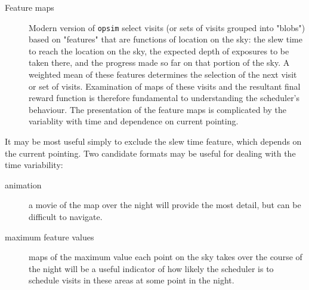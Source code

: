 \begin{description}
\item[{Feature maps}] Modern version of \texttt{opsim} select visits (or sets of visits grouped into "blobs") based on "features" that are functions of location on the sky: the slew time to reach the location on the sky, the expected depth of exposures to be taken there, and the progress made so far on that portion of the sky. A weighted mean of these features determines the selection of the next visit or set of visits. Examination of maps of these visits and the resultant final reward function is therefore fundamental to understanding the scheduler's behaviour. The presentation of the feature maps is complicated by the variablity with time and dependence on current pointing.
\end{description}
It may be most useful simply to exclude the slew time feature, which depends on the current pointing.
Two candidate formats may be useful for dealing with the time variability:
\begin{description}
\item[{animation}] a movie of the map over the night will provide the most detail, but can be difficult to navigate.
\item[{maximum feature values}] maps of the maximum value each point on the sky takes over the course of the night will be a useful indicator of how likely the scheduler is to schedule visits in these areas at some point in the night.
\end{description}
